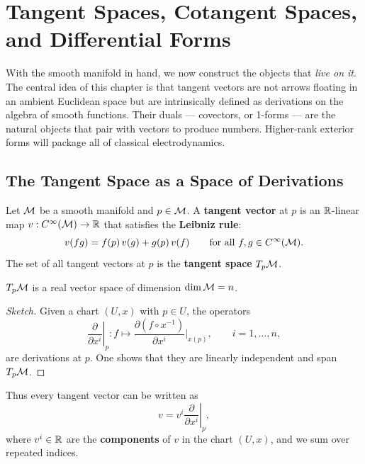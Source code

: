 \chapter{Tangent Spaces, Cotangent Spaces, and Differential Forms}

With the smooth manifold in hand, we now construct the objects that \emph{live on it}. The central idea of this chapter is that tangent vectors are not arrows floating in an ambient Euclidean space but are intrinsically defined as derivations on the algebra of smooth functions. Their duals --- covectors, or 1-forms --- are the natural objects that pair with vectors to produce numbers. Higher-rank exterior forms will package all of classical electrodynamics.

\section{The Tangent Space as a Space of Derivations}

\begin{definition}
Let $\mathcal{M}$ be a smooth manifold and $p \in \mathcal{M}$. A \textbf{tangent vector} at $p$ is an $\mathbb{R}$-linear map $v: C^{\infty}(\mathcal{M}) \to \mathbb{R}$ that satisfies the \textbf{Leibniz rule}:
\begin{equation}
v(fg) = f(p)\,v(g) + g(p)\,v(f) \qquad \text{for all } f, g \in C^{\infty}(\mathcal{M}).
\end{equation}
The set of all tangent vectors at $p$ is the \textbf{tangent space} $T_p\mathcal{M}$.
\end{definition}

\begin{proposition}
$T_p\mathcal{M}$ is a real vector space of dimension $\dim\mathcal{M} = n$.
\end{proposition}

\begin{proof}[Sketch]
Given a chart $(U, x)$ with $p \in U$, the operators
\begin{equation}
\left.\frac{\partial}{\partial x^i}\right|_p : f \mapsto \frac{\partial(f \circ x^{-1})}{\partial x^i}\bigg|_{x(p)}, \qquad i = 1, \ldots, n,
\end{equation}
are derivations at $p$. One shows that they are linearly independent and span $T_p\mathcal{M}$.
\end{proof}

Thus every tangent vector can be written as
\begin{equation}
v = v^i \left.\frac{\partial}{\partial x^i}\right|_p,
\end{equation}
where $v^i \in \mathbb{R}$ are the \textbf{components} of $v$ in the chart $(U, x)$, and we sum over repeated indices.

